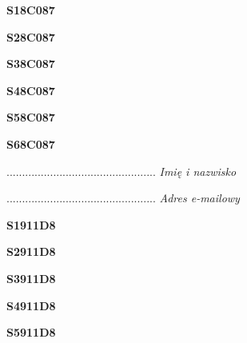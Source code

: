 \begin{turn}{90}\huge \textbf{S18C087}\end{turn}

\begin{turn}{90}\huge \textbf{S28C087}\end{turn}

\begin{turn}{90}\huge \textbf{S38C087}\end{turn}

\begin{turn}{90}\huge \textbf{S48C087}\end{turn}

\begin{turn}{90}\huge \textbf{S58C087}\end{turn}

\begin{turn}{90}\huge \textbf{S68C087}\end{turn}

\begin{turn}{90}\begin{minipage}{\linewidth} \vspace{20mm} ................................................  \textit{Imię i nazwisko}\end{minipage}\end{turn}

\begin{turn}{90}\begin{minipage}{\linewidth} \vspace{20mm} ................................................  \textit{Adres e-mailowy}\end{minipage}\end{turn}

\begin{turn}{90}\huge \textbf{S1911D8}\end{turn}

\begin{turn}{90}\huge \textbf{S2911D8}\end{turn}

\begin{turn}{90}\huge \textbf{S3911D8}\end{turn}

\begin{turn}{90}\huge \textbf{S4911D8}\end{turn}

\begin{turn}{90}\huge \textbf{S5911D8}\end{turn}

